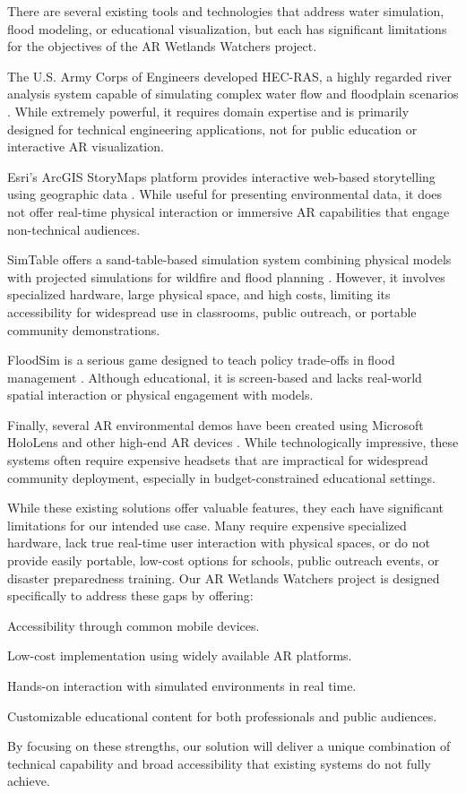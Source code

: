 There are several existing tools and technologies that address water simulation, flood modeling, or educational visualization, but each has significant limitations for the objectives of the AR Wetlands Watchers project.

The U.S. Army Corps of Engineers developed HEC-RAS, a highly regarded river analysis system capable of simulating complex water flow and floodplain scenarios \cite{HECRAS2024}. While extremely powerful, it requires domain expertise and is primarily designed for technical engineering applications, not for public education or interactive AR visualization.

Esri’s ArcGIS StoryMaps platform provides interactive web-based storytelling using geographic data \cite{ArcGIS2024}. While useful for presenting environmental data, it does not offer real-time physical interaction or immersive AR capabilities that engage non-technical audiences.

SimTable offers a sand-table-based simulation system combining physical models with projected simulations for wildfire and flood planning \cite{SimTable2023}. However, it involves specialized hardware, large physical space, and high costs, limiting its accessibility for widespread use in classrooms, public outreach, or portable community demonstrations.

FloodSim is a serious game designed to teach policy trade-offs in flood management \cite{FloodSim2023}. Although educational, it is screen-based and lacks real-world spatial interaction or physical engagement with models.

Finally, several AR environmental demos have been created using Microsoft HoloLens and other high-end AR devices \cite{HoloLens2023}. While technologically impressive, these systems often require expensive headsets that are impractical for widespread community deployment, especially in budget-constrained educational settings.

While these existing solutions offer valuable features, they each have significant limitations for our intended use case. Many require expensive specialized hardware, lack true real-time user interaction with physical spaces, or do not provide easily portable, low-cost options for schools, public outreach events, or disaster preparedness training. Our AR Wetlands Watchers project is designed specifically to address these gaps by offering:

\item Accessibility through common mobile devices.

\item Low-cost implementation using widely available AR platforms.

\item Hands-on interaction with simulated environments in real time.

\item Customizable educational content for both professionals and public audiences.

By focusing on these strengths, our solution will deliver a unique combination of technical capability and broad accessibility that existing systems do not fully achieve.